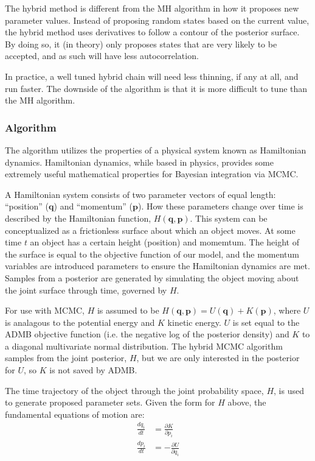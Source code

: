 \documentclass{article}\usepackage[]{graphicx}\usepackage[]{color}
\begin{document}
The hybrid method is different from the MH algorithm in how it proposes new
parameter values. Instead of proposing random states based on the current
value, the hybrid method uses derivatives to follow a contour of the
posterior surface. By doing so, it (in theory) only proposes states that
are very likely to be accepted, and as such will have less autocorrelation.

In practice, a well tuned hybrid chain will need less thinning, if any at
all, and run faster. The downside of the algorithm is that it is more
difficult to tune than the MH algorithm.
\subsubsection{Algorithm}
The algorithm utilizes the properties of a physical system known as
Hamiltonian dynamics. Hamiltonian dynamics, while based in physics,
provides some extremely useful mathematical properties for Bayesian
integration via MCMC.

A Hamiltonian system consists of two parameter vectors of equal length:
``position'' ($\mathbf{q}$) and ``momentum'' ($\mathbf{p}$). How these
parameters change over time is described by the Hamiltonian function,
$H(\mathbf{q},\mathbf{p})$. This system can be conceptualized as a
frictionless surface about which an object moves. At some time $t$ an
object has a certain height (position) and momemtum. The height of the
surface is equal to the objective function of our model, and the momentum
variables are introduced parameters to ensure the Hamiltonian dynamics are
met. Samples from a posterior are generated by simulating the object moving
about the joint surface through time, governed by $H$.

For use with MCMC, $H$ is assumed to be
$H(\mathbf{q},\mathbf{p})=U(\mathbf{q})+K(\mathbf{p})$, where $U$ is
analagous to the potential energy and $K$ kinetic energy. $U$ is set equal
to the ADMB objective function (i.e. the negative log of the posterior
density) and $K$ to a diagonal multivariate normal distribution. The hybrid
MCMC algorithm samples from the joint posterior, $H$, but we are only
interested in the posterior for $U$, so $K$ is not saved by ADMB.

The time trajectory of the object through the joint probability space, $H$,
is used to generate proposed parameter sets. Given the form for $H$ above,
the fundamental equations of motion are:
\begin{align}
  \label{eq:motion}
  \frac{dq_i}{dt} &= \frac{\partial{K}}{\partial{p_i}}\\
  \frac{dp_i}{dt} &= -\frac{\partial{U}}{\partial{q_i}}
\end{align}
\end{document}
